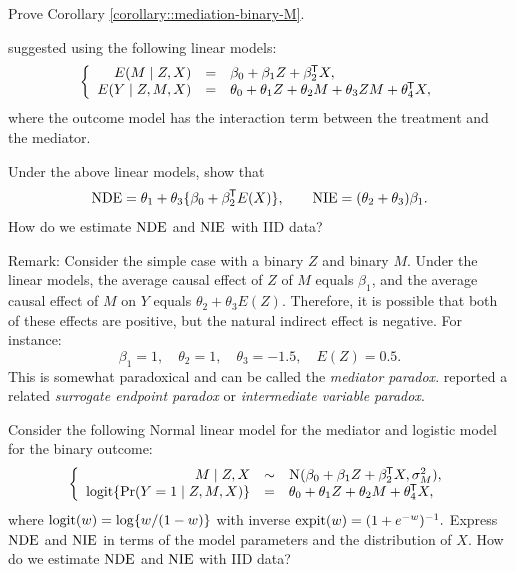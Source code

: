 \begin{HomeworkProblem}\label{exr:27-6}

Prove Corollary \ref{corollary::mediation-binary-M}.


\end{HomeworkProblem}

\begin{HomeworkProblem}\label{exr:27-7}
\citet{vanderweele2015explanation} suggested using the following linear models:
\[
\left\{\begin{array}{rcl}
E(M \mid Z, X) &=&  \beta_0 + \beta_1 Z + \beta_2^{\mkern-1.5mu\mathsf{T}} X, \\
E(Y\mid Z,M,X) &=& \theta_0 + \theta_1 Z + \theta_2 M + \theta_3 ZM + \theta_4^{\mkern-1.5mu\mathsf{T}} X,
\end{array}\right.
\]
where the outcome model has the interaction term between the treatment and the mediator.


Under the above linear models,  show that
\[
\mathrm{NDE} = \theta_1 + \theta_3\{ \beta_0 + \beta_2^{\mkern-1.5mu\mathsf{T}} E(X)\}, \qquad
\mathrm{NIE} = (\theta_2 + \theta_3 ) \beta_1.
\]
How do we estimate $\mathrm{NDE}$ and $\mathrm{NIE}$ with IID data?

Remark:
Consider the simple case with a binary $Z$ and binary $M$.
Under the linear models, the average causal effect of $Z$ of $M$ equals $\beta_1$, and the average causal effect of $M$ on $Y$ equals $\theta_2 + \theta_3 E(Z)$. Therefore, it is possible that both of these effects are positive, but the natural indirect effect is negative. For instance:
\[
\beta_1 = 1,\quad \theta_2 = 1, \quad  \theta_3= -1.5, \quad E(Z) = 0.5.
\]
This is somewhat paradoxical and can be called the {\it mediator paradox}. \citet{chen2007criteria} reported a related {\it surrogate endpoint paradox} or {\it intermediate variable paradox}.



\end{HomeworkProblem}

\begin{HomeworkProblem}\label{exr:27-8}


Consider the following Normal linear model for the mediator and logistic model for the binary outcome:
\[
\left\{\begin{array}{rcl}
M \mid Z, X &\sim &  \textsc{N}(\beta_0 + \beta_1 Z + \beta_2^{\mkern-1.5mu\mathsf{T}} X, \sigma_M^2), \\
\textup{logit} \{ \operatorname{Pr}(Y = 1 \mid Z,M,X ) \} &=& \theta_0 + \theta_1 Z + \theta_2 M +   \theta_4^{\mkern-1.5mu\mathsf{T}} X,
\end{array}\right.
\]
where $\textup{logit} (w)  = \log\{ w/(1-w) \} $ with inverse $\textup{expit}(w) = (1 + e^{-w})^{-1}.$
Express $\mathrm{NDE}$ and $\mathrm{NIE}$ in terms of the model parameters and the distribution of $X$. How do we estimate $\mathrm{NDE}$ and $\mathrm{NIE}$ with IID data?




\end{HomeworkProblem}

